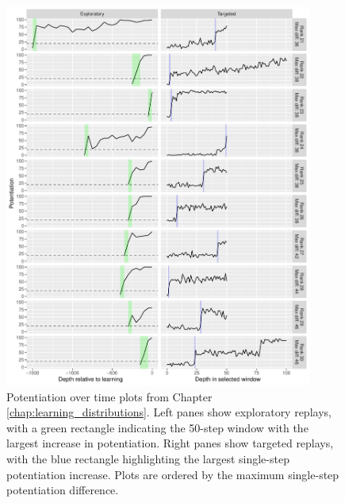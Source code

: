 \begin{figure}[!h]
    \begin{center}
    \includegraphics[width=0.9\textwidth]{07_appendix_potentiation_over_time/media/reps_21_30.pdf}
    \caption{Potentiation over time plots from Chapter \ref{chap:learning_distributions}.
    Left panes show exploratory replays, with a green rectangle indicating the 50-step window with the largest increase in potentiation. 
    Right panes show targeted replays, with the blue rectangle highlighting the largest single-step potentiation increase.
    Plots are ordered by the maximum single-step potentiation difference.}
    \label{fig:app_a_21_30}
    \end{center}
\end{figure}

